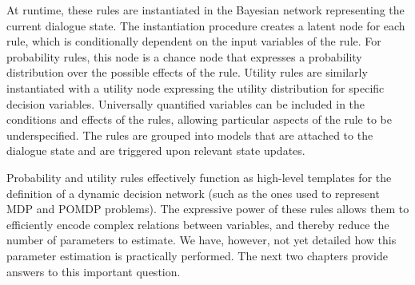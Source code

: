 At runtime, these rules are instantiated in the Bayesian network representing the current dialogue state. The instantiation procedure creates a latent node for each rule, which is conditionally dependent on the input variables of the rule.  For probability rules, this node is a chance node that expresses a probability distribution over the possible effects of the rule. Utility rules are similarly instantiated with a utility node expressing the utility distribution for specific decision variables.  Universally quantified variables can be included in the conditions and effects of the rules, allowing particular aspects of the rule to be underspecified. The rules are grouped into models that are attached to the dialogue state and are triggered upon relevant state updates. 

Probability and utility rules effectively function as high-level templates for the definition of a dynamic decision network (such as the ones used to represent MDP and POMDP problems). The expressive power of these rules allows them to efficiently encode complex relations between variables, and thereby reduce the number of parameters to estimate.  We have, however, not yet detailed how this parameter estimation is practically performed. The next two chapters provide answers to this important question. 
